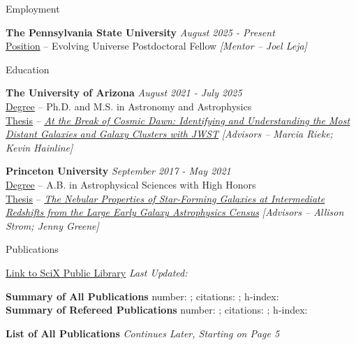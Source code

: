 \documentclass{JMH_CV}
\begin{document}

\begin{rSection}{Employment}

\textbf{The Pennsylvania State University} \hfill \textit{August 2025 - Present} 
\\ \ul{Position} -- Evolving Universe Postdoctoral Fellow \hfill \textit{[Mentor -- Joel Leja]}

\end{rSection}


\begin{rSection}{Education}

\textbf{The University of Arizona} \hfill \textit{August 2021 - July 2025} 
\\ \ul{Degree} -- Ph.D. and M.S. in Astronomy and Astrophysics
\\ \ul{Thesis} -- \href{https://repository.arizona.edu/handle/10150/677941}{\ul{\textit{At the Break of Cosmic Dawn: Identifying and Understanding the Most Distant Galaxies and Galaxy Clusters with JWST}}} \hfill \textit{[Advisors -- Marcia Rieke; Kevin Hainline]}

\textbf{Princeton University} \hfill \textit{September 2017 - May 2021} 
\\ \ul{Degree} -- A.B. in Astrophysical Sciences with High Honors
\\ \ul{Thesis} -- \href{http://arks.princeton.edu/ark:/88435/dsp011n79h7405}{\ul{\textit{The Nebular Properties of Star-Forming Galaxies at Intermediate Redshifts from the Large Early Galaxy Astrophysics Census}}} \hfill \textit{[Advisors -- Allison Strom; Jenny Greene]}

\end{rSection}


\begin{rSection}{Publications}

\href{https://scixplorer.org/public-libraries/57nm1ouuTMusp62fvjiXYg}{\ul{Link to SciX Public Library}} \hfill \textit{Last Updated: \DateOfLastUpdate}

\textbf{Summary of All Publications} \hfill number: \TotalCitationNumber; citations: \TotalCitationCount; h-index: \TotalIndexH \\
\textbf{Summary of Refereed Publications} \hfill number: \RefereedCitationNumber; citations: \RefereedCitationCount; h-index: \RefereedIndexH

\textbf{List of All Publications} \hfill \textit{Continues Later, Starting on Page 5}


\end{rSection}
\end{document}
